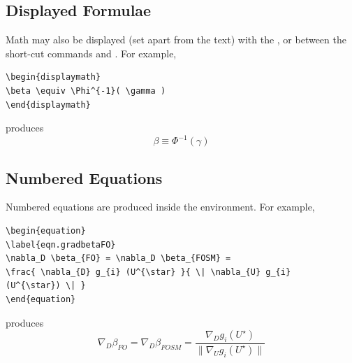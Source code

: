 \subsection{Displayed Formulae}
Math may also be displayed (set apart from the text) with the , or between the short-cut commands \cmmd{[} and \cmmd{]}.
For example,
\begin{verbatim}
\begin{displaymath}
\beta \equiv \Phi^{-1}( \gamma )
\end{displaymath}
\end{verbatim}
produces
\begin{displaymath}
\beta \equiv \Phi^{-1}( \gamma )
\end{displaymath}
\subsection{Numbered Equations}
Numbered equations are produced inside the  environment.
For example,
\begin{verbatim}
\begin{equation}
\label{eqn.gradbetaFO}
\nabla_D \beta_{FO} = \nabla_D \beta_{FOSM} =
\frac{ \nabla_{D} g_{i} (U^{\star} }{ \| \nabla_{U} g_{i} 
(U^{\star}) \| }
\end{equation}
\end{verbatim}
produces
\begin{equation}
\label{eqn.gradbetaFO}
\nabla_D \beta_{FO} = \nabla_D \beta_{FOSM} =
\frac{ \nabla_{D} g_{i} (U^{\star}) }{ \| \nabla_{U} g_{i} 
(U^{\star}) \| }
\end{equation}
